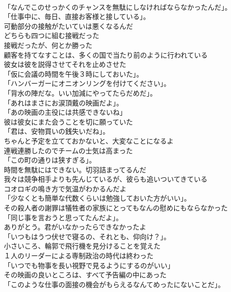 \documentclass[8pt]{extreport}
\begin{document}
\begin{CJK}{UTF8}{min}
\\	「なんでこのせっかくのチャンスを無駄にしなければならなかったんだ」。	
\\	「仕事中に、毎日、直接お客様と接している」。	
\\	可動部分の接触がたいていは悪くなるんだ	
\\	どちらも四つに組む接戦だった 
\\	接戦だったが、何とか勝った	
\\	顧客を持てなすことは、多くの国で当たり前のように行われている	
\\	彼女は彼を説得させてそれを止めさせた	
\\	「仮に会議の時間を午後３時にしておいた」。	
\\	「ハンバーガーにオニオンリングを付けてください」。	
\\	「背水の陣だな。いい加減にやってたらだめだ」。	
\\	「あれはまさにお涙頂戴の映画だよ」。	
\\	「あの映画の主役には共感できないね」	
\\	彼は彼女にまた会うことを切に願っていた	
\\	「君は、安物買いの銭失いだね」。	
\\	ちゃんと予定を立てておかないと、大変なことになるよ	
\\	連戦連勝したのでチームの士気は高まった	
\\	「この町の通りは狭すぎる」。	
\\	時間を無駄にはできない。切羽詰まってるんだ	
\\	我々は競争相手よりも先んじているが、彼らも追いついてきている	
\\	コオロギの鳴き方で気温がわかるんだよ	
\\	「少なくとも簡単な代数くらいは勉強しておいた方がいい」。	
\\	その殺人者の謝罪は犠牲者の家族にとってもなんの慰めにもならなかった	
\\	「同じ事を言おうと思ってたんだよ」。	
\\	ありがとう。君がいなかったらできなかったよ	
\\	「いつもはうつ伏せで寝るの、それとも、仰向け？」。	
\\	小さいころ、輪郭で飛行機を見分けることを覚えた	
\\	１人のリーダーによる専制政治の時代は終わった	
\\	「いつでも物事を長い視野で見るようにするのがいい」	
\\	その映画の良いところは、すべて予告編の中にあった	
\\	「このような仕事の面接の機会がもらえるなんてめったにないことだ」。	

\end{CJK}
\end{document}
